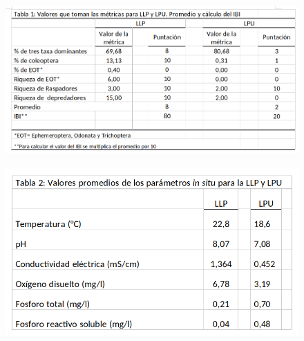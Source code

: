 \documentclass[final]{beamer}
\newlength{\onecolwid}
\begin{document}
\begin{frame}[t]
\begin{columns}[t]
\begin{column}{\onecolwid}
				\begin{multicols}{2}
                \begin{figure}
                	\vspace*{-0.90cm}
                    \includegraphics[width=1.0\linewidth]{ibi.png}
				\end{figure}
                \begin{figure}
                	\vspace*{-0.90cm}
                    \includegraphics[width=0.9\linewidth]{fq.png}
				\end{figure}
                \end{multicols}
				
         \begin{block}{ }
                

\end{block}
\end{column}
\end{columns}
\end{frame}
\end{document}
